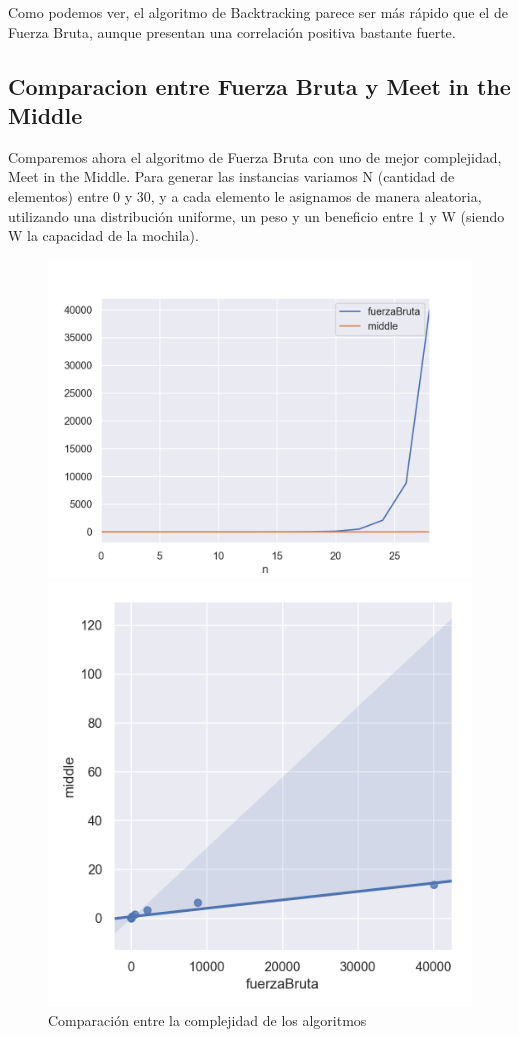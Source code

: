 Como podemos ver, el algoritmo de Backtracking parece ser más rápido que el de Fuerza Bruta, aunque presentan una correlación positiva bastante fuerte.

\subsection{Comparacion entre Fuerza Bruta y Meet in the Middle}
Comparemos ahora el algoritmo de Fuerza Bruta con uno de  mejor complejidad, Meet in the Middle. Para generar las instancias variamos N (cantidad de elementos) entre 0 y 30, y a cada elemento le asignamos de manera aleatoria, utilizando una distribución uniforme, un peso y un beneficio entre 1 y W (siendo W la capacidad de la mochila). 

\begin{figure}[H]
   \begin{minipage}{0.5\textwidth}
     \centering
     \includegraphics[width=0.9\linewidth]{img/fb_vs_middle_1}
     \caption{Comparación entre la complejidad de los algoritmos}
   \end{minipage}\hfill
   \begin{minipage}{0.5\textwidth}
     \centering
     \includegraphics[width=0.9\linewidth]{img/fb_vs_middle_2}

\end{minipage}
\end{figure}
